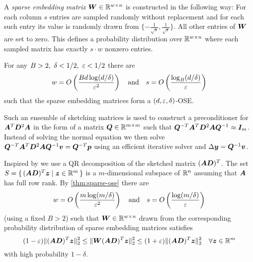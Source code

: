 \begin{definition}
A \emph{sparse embedding matrix} \(\bm{W} \in \mathbb{R}^{w \times n}\) is constructed in the following way:
For each column \(s\) entries are sampled randomly without replacement and for each such entry its value is randomly drawn from \(\{ - \frac{1}{\sqrt{s}}, \frac{1}{\sqrt{s}} \}\).
All other entries of \(\bm{W}\) are set to zero.
This defines a probability distribution over \(\mathbb{R}^{w \times n}\) where each sampled matrix has exactly \(s \cdot w\) nonzero entries.
\end{definition}

\begin{theorem}  \label{thm:sparse-ose}
For any \(B > 2, \ \delta < 1/2, \ \varepsilon < 1/2\) there are
\[ w = O \left( \frac{B d \log(d/\delta)}{\varepsilon^2} \right) \quad \text{and} \quad s = O \left( \frac{\log_B(d/\delta)}{\varepsilon} \right)\]
such that the sparse embedding matrices form a \((d, \varepsilon, \delta)\)-OSE.
\end{theorem}

Such an ensemble of sketching matrices is used to construct a preconditioner for \(\bm{A}^T \bm{D}^2 \bm{A}\) in the form of a matrix \(\bm{Q} \in \mathbb{R}^{m \times m}\) such that
\( \bm{Q}^{-T} \bm{A}^T \bm{D}^2 \bm{A} \bm{Q}^{-1} \approx \bm{I}_m \).
Instead of solving the normal equation we then solve
\( \bm{Q}^{-T} \bm{A}^T \bm{D}^2 \bm{A} \bm{Q}^{-1} \bm{v} = \bm{Q}^{-T} \bm{p} \)
using an efficient iterative solver and \(\Delta\bm{y} = \bm{Q}^{-1} \bm{v}\).

Inspired by \textcite{Avron-FasterRandomizedInfeasibleIPMs} we use a QR decomposition of the sketched matrix \((\bm{A}\bm{D})^T\).
The set \(S = \set{ (\bm{A}\bm{D})^T \bm{z} | \bm{z} \in \mathbb{R}^m}\) is a \(m\)-dimensional subspace of \(\mathbb{R}^n\) assuming that \(\bm{A}\) has full row rank.
By \cref{thm:sparse-ose} there are
\[ w = O \left(  \frac{m \log(m/\delta)}{\varepsilon^2}  \right) \quad \text{and} \quad s = O \left(  \frac{\log(m/\delta)}{\varepsilon}  \right)\]
(using a fixed \(B > 2\)) such that \(\bm{W} \in \mathbb{R}^{w \times n}\) drawn from the corresponding probability distribution of sparse embedding matrices satisfies
\begin{equation}
  (1-\varepsilon) \lVert (\bm{A}\bm{D})^T \bm{z} \rVert_2^2 \leq \lVert \bm{W}(\bm{A}\bm{D})^T \bm{z} \rVert_2^2 \leq (1+\varepsilon)\lVert (\bm{A}\bm{D})^T \bm{z} \rVert_2^2 \quad \forall \bm{z} \in \mathbb{R}^m
\end{equation}
with high probability \(1 - \delta\).